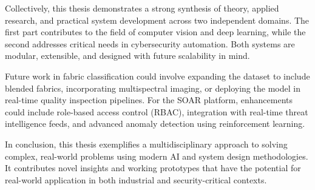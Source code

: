 Collectively, this thesis demonstrates a strong synthesis of theory, applied research, and practical system development across two independent domains. The first part contributes to the field of computer vision and deep learning, while the second addresses critical needs in cybersecurity automation. Both systems are modular, extensible, and designed with future scalability in mind.

Future work in fabric classification could involve expanding the dataset to include blended fabrics, incorporating multispectral imaging, or deploying the model in real-time quality inspection pipelines. For the SOAR platform, enhancements could include role-based access control (RBAC), integration with real-time threat intelligence feeds, and advanced anomaly detection using reinforcement learning.

In conclusion, this thesis exemplifies a multidisciplinary approach to solving complex, real-world problems using modern AI and system design methodologies. It contributes novel insights and working prototypes that have the potential for real-world application in both industrial and security-critical contexts.
